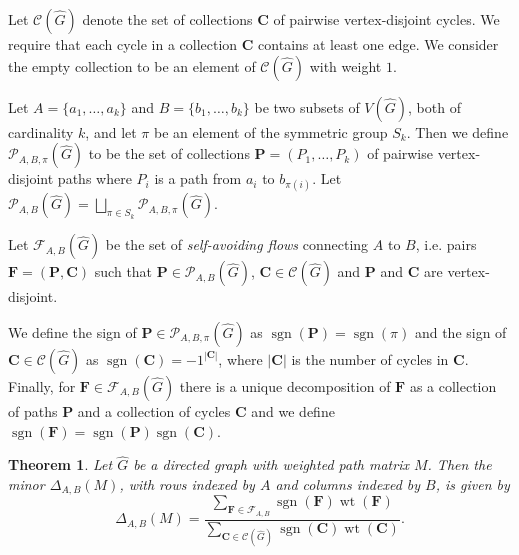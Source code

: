 \documentclass[a4paper, 11pt]{amsart}
\newtheorem{theorem}{Theorem}
\numberwithin{theorem}{section}
\newcommand{\aG}{\widehat{G}}
\def\sgn{{\operatorname{sgn}}}
\def\F{{\mathcal F}}
\newcommand{\wt}{\operatorname{wt}}
\begin{document}
Let $\mathcal C(\aG)$ denote the set of collections $\mathbf{C}$
of pairwise vertex-disjoint cycles. We require that each cycle in a
collection $\mathbf{C}$ contains at least one edge. We consider the
empty collection to be an element of $\mathcal{C}(\aG)$ with weight $1$.

Let $A=\{a_1,\dots ,a_k\}$ and $B= \{b_1,\dots ,b_k\}$ be two subsets of
$V(\aG)$, both of cardinality $k$, and let $\pi$ be an element
of the symmetric group $S_k$. Then we define $\mathcal
P_{A,B,\pi}(\aG)$ to be the set of collections $\mathbf{P} =
(P_1,\dots ,P_k)$ of pairwise vertex-disjoint paths where $P_i$ is a
path from $a_i$ to $b_{\pi(i)}$. Let $\mathcal{P}_{A,B}(\aG) =
\bigsqcup_{\pi \in S_k} \mathcal{P}_{A,B,\pi}(\aG)$. 

Let $\mathcal{F}_{A,B}(\aG)$ be the set of \emph{self-avoiding
flows} connecting $A$ to $B$, i.e. pairs $\mathbf{F} =
(\mathbf{P},\mathbf C)$ such that $\mathbf{P}\in
\mathcal{P}_{A,B}(\aG)$, $\mathbf{C}\in \mathcal C(\aG)$ and $\mathbf{P}$ and $\mathbf{C}$ are vertex-disjoint.

We define the sign of $\mathbf{P}\in \mathcal{P}_{A,B,\pi}(\aG)$
as $\sgn(\mathbf P) = \sgn (\pi)$ and the sign of $\mathbf{C}\in
\mathcal C(\aG)$ as $\sgn(\mathbf C) = -1^{|\mathbf C|}$, where
$|\mathbf C|$ is the number of cycles in $\mathbf C$. Finally, for
$\mathbf F\in \mathcal{F}_{A,B}(\aG)$ there is a unique decomposition of $\mathbf{F}$ as a collection of paths $\mathbf P$ and a collection of cycles $\mathbf C$ and we define $\sgn(\mathbf F) = \sgn(\mathbf{P})\sgn(\mathbf C)$.


\begin{theorem}{\cite[Theorem~2.5]{talaska2012}} \label{thm:Talaska-2012}
    Let $\aG$ be a directed graph with weighted path matrix $M$. Then the minor $\Delta_{A,B}(M)$, with rows indexed by $A$ and columns indexed by $B$, is given by
    $$
        \Delta_{A,B}(M) = \frac{\sum_{\mathbf{F}\in \F_{A,B}}\sgn
	(\mathbf{F})\wt (\mathbf{F})}{\sum_{\mathbf{C}\in
	\mathcal{C}(\aG)}\sgn (\mathbf{C})\wt(\mathbf{C})}.
    $$
\end{theorem}
\end{document}
